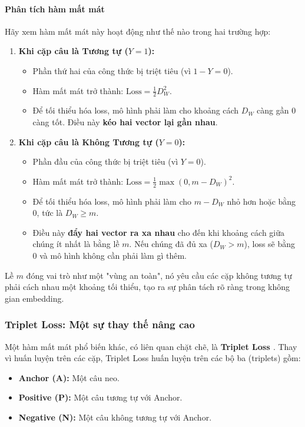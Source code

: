 \paragraph{Phân tích hàm mất mát}
Hãy xem hàm mất mát này hoạt động như thế nào trong hai trường hợp:
\begin{enumerate}
    \item \textbf{Khi cặp câu là Tương tự ($Y=1$):}
        \begin{itemize}
            \item Phần thứ hai của công thức bị triệt tiêu (vì $1-Y=0$).
            \item Hàm mất mát trở thành: $\text{Loss} = \frac{1}{2} D_W^2$.
            \item Để tối thiểu hóa loss, mô hình phải làm cho khoảng cách $D_W$ càng gần 0 càng tốt. Điều này \textbf{kéo hai vector lại gần nhau}.
        \end{itemize}
    \item \textbf{Khi cặp câu là Không Tương tự ($Y=0$):}
        \begin{itemize}
            \item Phần đầu của công thức bị triệt tiêu (vì $Y=0$).
            \item Hàm mất mát trở thành: $\text{Loss} = \frac{1}{2} \max(0, m - D_W)^2$.
            \item Để tối thiểu hóa loss, mô hình phải làm cho $m - D_W$ nhỏ hơn hoặc bằng 0, tức là $D_W \geq m$.
            \item Điều này \textbf{đẩy hai vector ra xa nhau} cho đến khi khoảng cách giữa chúng ít nhất là bằng lề $m$. Nếu chúng đã đủ xa ($D_W > m$), loss sẽ bằng 0 và mô hình không cần phải làm gì thêm.
        \end{itemize}
\end{enumerate}
Lề $m$ đóng vai trò như một "vùng an toàn", nó yêu cầu các cặp không tương tự phải cách nhau một khoảng tối thiểu, tạo ra sự phân tách rõ ràng trong không gian embedding.

\subsubsection{Triplet Loss: Một sự thay thế nâng cao}
\label{ssec:triplet_loss}

Một hàm mất mát phổ biến khác, có liên quan chặt chẽ, là \textbf{Triplet Loss \cite{schroff2015facenet}}. Thay vì huấn luyện trên các cặp, Triplet Loss huấn luyện trên các bộ ba (triplets) gồm:
\begin{itemize}
    \item \textbf{Anchor (A):} Một câu neo.
    \item \textbf{Positive (P):} Một câu tương tự với Anchor.
    \item \textbf{Negative (N):} Một câu không tương tự với Anchor.
\end{itemize}

